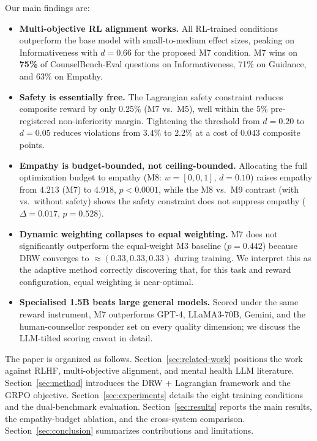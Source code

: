 \documentclass[10pt,twocolumn]{article}
\begin{document}
Our main findings are:
\begin{itemize}
    \item \textbf{Multi-objective RL alignment works.} All RL-trained conditions outperform the base model with small-to-medium effect sizes, peaking on Informativeness with $d = 0.66$ for the proposed M7 condition. M7 wins on \textbf{75\%} of CounselBench-Eval questions on Informativeness, 71\% on Guidance, and 63\% on Empathy.
    \item \textbf{Safety is essentially free.} The Lagrangian safety constraint reduces composite reward by only 0.25\% (M7 vs.\ M5), well within the 5\% pre-registered non-inferiority margin. Tightening the threshold from $d = 0.20$ to $d = 0.05$ reduces violations from $3.4\%$ to $\mathbf{2.2\%}$ at a cost of $0.043$ composite points.
    \item \textbf{Empathy is budget-bounded, not ceiling-bounded.} Allocating the full optimization budget to empathy (M8: $w = [0, 0, 1]$, $d = 0.10$) raises empathy from $4.213$ (M7) to $\mathbf{4.918}$, $p < 0.0001$, while the M8 vs.\ M9 contrast (with vs.\ without safety) shows the safety constraint does not suppress empathy ($\Delta = 0.017$, $p = 0.528$).
    \item \textbf{Dynamic weighting collapses to equal weighting.} M7 does not significantly outperform the equal-weight M3 baseline ($p = 0.442$) because DRW converges to $\approx (0.33, 0.33, 0.33)$ during training. We interpret this as the adaptive method correctly discovering that, for this task and reward configuration, equal weighting is near-optimal.
    \item \textbf{Specialised 1.5B beats large general models.} Scored under the same reward instrument, M7 outperforms GPT-4, LLaMA3-70B, Gemini, and the human-counsellor responder set on every quality dimension; we discuss the LLM-tilted scoring caveat in detail.
\end{itemize}

The paper is organized as follows. Section~\ref{sec:related-work} positions the work against RLHF, multi-objective alignment, and mental health LLM literature. Section~\ref{sec:method} introduces the DRW + Lagrangian framework and the GRPO objective. Section~\ref{sec:experiments} details the eight training conditions and the dual-benchmark evaluation. Section~\ref{sec:results} reports the main results, the empathy-budget ablation, and the cross-system comparison. Section~\ref{sec:conclusion} summarizes contributions and limitations.
\end{document}
